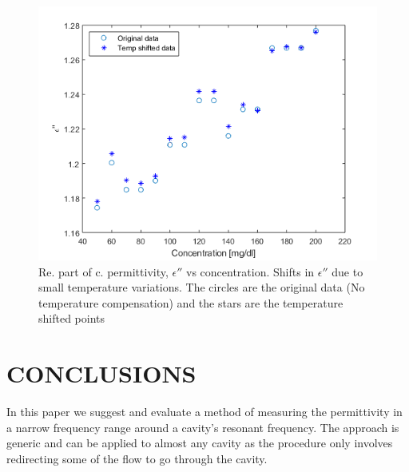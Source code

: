 \documentclass[10pt,final,conference,a4paper,twocolumn]{IEEEtran_AntennEMB_GigaHertz2016}
\begin{document}
\begin{figure}[t]
	\centering
	\includegraphics[width=1.0\columnwidth]{pumpgluzoomEIM.png}
	\caption{Re. part of c. permittivity, $\epsilon''$ vs concentration. Shifts in $\epsilon''$ due to small temperature variations. The circles are the original data (No temperature compensation) and the stars are the temperature shifted points}
	\label{fig:eim}
\end{figure}









\section{CONCLUSIONS}
In this paper we suggest and evaluate a method of measuring the permittivity in a narrow frequency range around a cavity's resonant frequency. The approach is generic and can be applied to almost any cavity as the procedure only involves redirecting some of the flow to go through the cavity.
\end{document}
